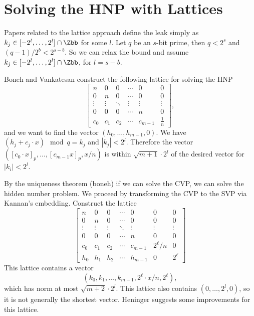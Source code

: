 \section{Solving the HNP with Lattices}

Papers related to the lattice approach define the leak simply as $k_j \in [-2^l, \ldots, 2^l] \cap \Zbb$ for some $l$. Let $q$ be an $s$-bit prime, then $q < 2^{s}$ and $(q-1)/2^{b} < 2^{s-b}$. So we can relax the bound and assume $k_j \in [-2^l, \ldots, 2^l] \cap \Zbb$, for $l = s-b$.

Boneh and Vankatesan construct the following lattice for solving the HNP
\begin{equation}
    \begin{bmatrix}
    n & 0 & 0 & \cdots & 0 & 0 \\
    0 & n & 0 & \cdots & 0 & 0 \\
    \vdots & \vdots & \ddots & \vdots & \vdots & \vdots \\
    0 & 0 & 0 & \cdots & n & 0 \\
    c_0 & c_1 & c_2 & \cdots & c_{m-1} & \frac{1}{n}
    \end{bmatrix},
\end{equation}
and we want to find the vector $(h_0, \ldots, h_{m-1}, 0)$. We have $(h_j + c_j \cdot x) \mod{q} = k_j$ and  $ |k_j|< 2^l$. Therefore the vector $([c_0 \cdot x]_p, \dots, [c_{m-1}x]_p, x/n)$ is within $\sqrt{m+1}\cdot 2^l$ of the desired vector for $|k_i| < 2^l$. 

By the uniqueness theorem (boneh) if we can solve the CVP, we can solve the hidden number problem. We proceed by transforming the CVP to the SVP via Kannan's embedding. Construct the lattice 
\[
\begin{bmatrix}
n & 0 & 0 & \cdots & 0 & 0 & 0 \\
0 & n & 0 & \cdots & 0 & 0 & 0 \\
\vdots & \vdots & \vdots & \ddots & \vdots & \vdots & \vdots \\
0 & 0 & 0 & \cdots & n & 0 & 0 \\
c_0 & c_1 & c_2 & \cdots & c_{m-1} & 2^\ell / n & 0 \\
h_0 & h_1 & h_2 & \cdots & h_{m-1} & 0 & 2^\ell
\end{bmatrix}
\]
This lattice contains a vector
\[
(k_0, k_1, \ldots, k_{m-1}, 2^\ell \cdot x / n, 2^\ell),
\]
which has norm at most $\sqrt{m+2} \cdot 2^l$. This lattice also contains $(0,\ldots, 2^l, 0)$, so it is not generally the shortest vector. Heninger suggests some improvements for this lattice.

